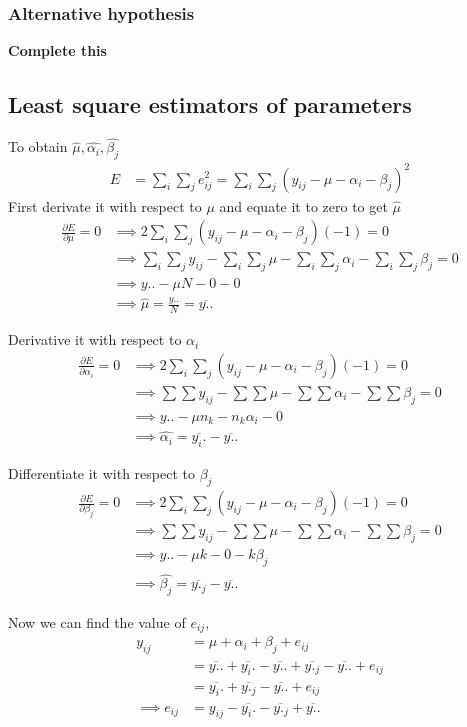 \documentclass[oneside,11pt,pdftex]{book}%
\numberwithin{equation}{section}
\numberwithin{section}{chapter}
\numberwithin{equation}{chapter}
\begin{document}
\subsubsection{Alternative hypothesis}
\textbf{Complete this}

\subsection{Least square estimators of parameters}
To obtain $ \hat{\mu}, \hat{\alpha_i} , \hat{\beta_j}$
\begin{align*}
	E&=\sum_i \sum_j e_{ij}^2=\sum_i \sum_j (y_{ij}-\mu-\alpha_i -\beta_j)^2
\end{align*}
First derivate it with respect to $ \mu  $ and equate it to zero to get $ \hat{\mu } $
\begin{align*}
	\frac{\partial E}{\partial \mu }=0 &\implies 2 \sum_i \sum_j (y_{ij}-\mu-\alpha_i - \beta_j)(-1)=0\\
	&\implies \sum_i \sum_j y_{ij} - \sum_i \sum_j \mu - \sum_i \sum_j \alpha_i - \sum_i \sum_j \beta_j=0\\
	&\implies y..-\mu N - 0 - 0\\
	&\implies \hat{\mu}=\frac{y..}{N}=\overline{y..}
\end{align*}

Derivative it with respect to $ \alpha_i $
\begin{align*}
	\frac{\partial E}{\partial \alpha_i }=0 &\implies 2 \sum_i \sum_j (y_{ij}-\mu-\alpha_i - \beta_j)(-1)=0\\
	&\implies \sum \sum y_{ij} - \sum \sum \mu - \sum \sum \alpha_i - \sum \sum \beta_j=0\\
	&\implies y..- \mu n_k - n_k \alpha_i - 0\\
	&\implies \hat{\alpha_i}=\overline{y_i.}-\overline{y..}
\end{align*}

Differentiate it with respect to $ \beta_j $
\begin{align*}
		\frac{\partial E}{\partial \beta_j }=0 &\implies 2 \sum_i \sum_j (y_{ij}-\mu-\alpha_i - \beta_j)(-1)=0\\
		&\implies \sum \sum y_{ij} - \sum \sum \mu - \sum \sum \alpha_i - \sum \sum \beta_j=0\\
		&\implies y..- \mu k - 0 - k \beta_j\\
		&\implies \hat{\beta_j}=\overline{y._j}-\overline{y..}
\end{align*}

Now we can find the value of $ e_{ij} $,
\begin{align*}
	y_{ij}&=\mu+\alpha_i+\beta_j+e_{ij}\\
	&=\overline{y..}+\overline{y_i.}-\overline{y..}+\overline{y._j}-\overline{y..}+e_{ij}\\
	&=\overline{y_i.}+\overline{y._j}-\overline{y..}+e_{ij}\\
	\implies e_{ij}&=y_{ij}-\overline{y_i.}-\overline{y._j}+\overline{y..}
\end{align*}
\end{document}
